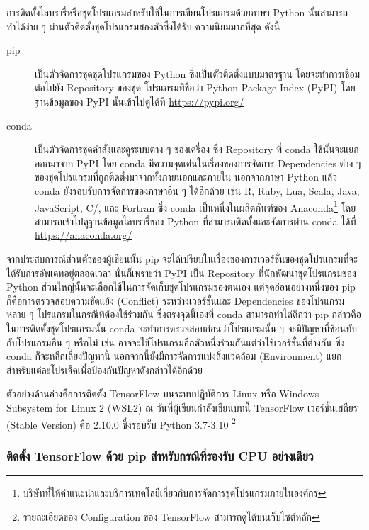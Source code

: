 การติดตั้งไลบรารี่หรือชุดโปรแกรมสำหรับใช้ในการเขียนโปรแกรมด้วยภาษา Python นั้นสามารถทำได้ง่าย ๆ ผ่านตัวติดตั้งชุดโปรแกรมสองตัวซึ่งได้รับ%
ความนิยมมากที่สุด ดังนี้

\begin{description}
    \item[pip] เป็นตัวจัดการชุดชุดโปรแกรมของ Python ซึ่งเป็นตัวติดตั้งแบบมาตรฐาน โดยจะทำการเชื่อมต่อไปยัง Repository ของชุด%
    โปรแกรมที่ชื่อว่า Python Package Index (PyPI) โดยฐานข้อมูลของ PyPI นั้นเข้าไปดูได้ที่ \url{https://pypi.org/}
    
    \item[conda] เป็นตัวจัดการชุดคำสั่งและดูระบบต่าง ๆ ของเครื่อง ซึ่ง Repository ที่ conda ใช้นั้นจะแยกออกมาจาก PyPI โดย conda 
    มีความจุดเด่นในเรื่องของการจัดการ Dependencies ต่าง ๆ ของชุดโปรแกรมที่ถูกติดตั้งมาจากทั้งภายนอกและภายใน นอกจากภาษา Python 
    แล้ว conda ยังรอบรับการจัดการของภาษาอื่น ๆ ได้อีกด้วย เช่น R, Ruby, Lua, Scala, Java, JavaScript, C/\cpp, และ Fortran
    ซึ่ง conda เป็นหนึ่งในผลิตภันฑ์ของ Anaconda\footnote{บริษัทที่ให้คำแนะนำและบริการเทคโลยีเกี่ยวกับการจัดการชุดโปรแกรมภายในองค์กร}
    โดยสามารถเข้าไปดูฐานข้อมูลไลบรารี่ของ Python ที่สามารถติดตั้งและจัดการผ่าน conda ได้ที่ \url{https://anaconda.org/}
\end{description}

จากประสบการณ์ส่วนตัวของผู้เขียนนั้น pip จะได้เปรียบในเรื่องของการเวอร์ชั่นของชุดโปรแกรมที่จะได้รับการอัพเดทอยู่ตลอดเวลา นั่นก็เพราะว่า PyPI
เป็น Repository ที่นักพัฒนาชุดโปรแกรมของ Python ส่วนใหญ่นั้นจะเลือกใช้ในการจัดเก็บชุดโปรแกรมของตนเอง แต่จุดอ่อนอย่างหนึ่งของ pip 
ก็คือการตรวจสอบความขัดแย้ง (Conflict) ระหว่างเวอร์ชั่นและ Dependencies ของโปรแกรมหลาย ๆ โปรแกรมในกรณีที่ต้องใช้ร่วมกัน 
ซึ่งตรงจุดนี้เองที่ conda สามารถทำได้ดีกว่า pip กล่าวคือ ในการติดตั้งชุดโปรแกรมนั้น conda จะทำการตรวจสอบก่อนว่าโปรแกรมนั้น ๆ 
จะมีปัญหาที่ซ้อนทับกับโปรแกรมอื่น ๆ หรือไม่ เช่น อาจจะใช้โปรแกรมอีกตัวหนึ่งร่วมกันแต่ว่าใช้เวอร์ชั่นที่ต่างกัน ซึ่ง conda ก็จะหลีกเลี่ยงปัญหานี้
นอกจากนี้ยังมีการจัดการแบ่งสิ่งแวดล้อม (Environment) แยกสำหรับแต่ละโปรเจ็คเพื่อป้องกันปัญหาดังกล่าวได้อีกด้วย

ตัวอย่างด้านล่างคือการติดตั้ง TensorFlow บนระบบปฏิบัติการ Linux หรือ Windows Subsystem for Linux 2 (WSL2)
\noindent ณ วันที่ผู้เขียนกำลังเขียนบทนี้ TensorFlow เวอร์ชั่นเสถียร (Stable Version) คือ 2.10.0 ซึ่งรอบรับ Python 3.7-3.10%
\footnote{รายละเอียดของ Configuration ของ TensorFlow สามารถดูได้บนเว็บไซต์หลัก}

\subsubsection{ติดตั้ง TensorFlow ด้วย pip สำหรับกรณีที่รองรับ CPU อย่างเดียว}

